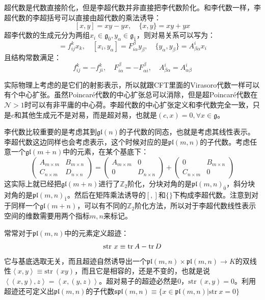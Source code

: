 超代数是代数直接阶化，但是李超代数并非直接把李代数阶化。和李代数一样，李超代数的李超括号可以直接由超代数的乘法诱导：
$$[x,y]=xy-yx,\quad\{x,y\}=xy+yx$$
超李代数的生成元分为两组$x_i\in\mathfrak{g}_{\bar 0},y_\alpha\in\mathfrak{g}_{\bar 1}$，则对易关系可以写为：
\begin{equation}
	[x_i,x_j]=f^k_{ij}x_k,\quad [x_i,y_\alpha]=F^\beta_{i\alpha}y_\beta,\quad \{y_\alpha,y_\beta\}=A^i_{\beta\alpha}x_i
\end{equation}
且结构常数满足：
\begin{equation}
	f^k_{ij}=-f^k_{ji},\quad F^\beta_{i\alpha}=-F^\beta_{\alpha i},\quad A^i_{\beta\alpha}=A^i_{\alpha\beta}
\end{equation}

实际物理上考虑的是它们的射影表示，所以就跟CFT里面的Virasoro代数一样可以有个中心扩张。虽然Poincar\'e代数的中心扩张总可以消除，但是超Poincar\'e代数在$\mathcal{N}>1$时可以有非平庸的中心荷。李超代数的中心扩张定义和李代数完全一致，只是$c$和其他生成元不是对易，而是超对易，也就是$(c,x)=0,\forall x\in\mathfrak{g}$。

\begin{example}[一般线性李超代数]
	李代数比较重要的是考虑其到$\mathfrak{gl}(n)$的子代数的同态，也就是考虑其线性表示。李超代数这边同样也会考虑表示，这个时候对应的是$\mathfrak{pl}(m,n)$的子代数。考虑任意一个$\mathfrak{gl}(m+n)$中的元素，在某个基底下：
	\begin{equation}
		\begin{pmatrix}A_{m\times m}&B_{m\times n}\\C_{n\times m}&D_{n\times n}\end{pmatrix}=\begin{pmatrix}A_{m\times m}&0\\0&D_{n\times n}\end{pmatrix}+\begin{pmatrix}0&B_{m\times n}\\C_{n\times m}&0\end{pmatrix}
	\end{equation}
	这实际上就已经把$\mathfrak{gl}(m+n)$进行了$\mathbb{Z}_2$阶化，分块对角的是$\mathfrak{pl}(m,n)_{\bar 0}$，斜分块对角的是$\mathfrak{pl}(m,n)_{\bar 1}$。然后在矩阵乘法诱导的$[,]$和$\{\}$下构成李超代数。注意到对于同样一个$\mathfrak{gl}(m+n)$，可以有不同的$\mathbb{Z}_2$阶化方法，所以对于李超代数线性表示空间的维数需要用两个指标$m,n$来标记。
	
	常常对于$\mathfrak{pl}(m,n)$中的元素定义超迹：
	\begin{equation}
		\mathrm{str}\  x\equiv\tr A-\tr D
	\end{equation}
	它与基底选取无关，而且超迹自然诱导出一个$\mathfrak{pl}(m,n)\times\mathfrak{pl}(m,n)\to K$的双线性$\left<x,y\right>\equiv\mathrm{str}\ (xy)$，而且它是相容的，还是不变的，也就是说$\left<(x,y),z\right>=\left<x,(y,z)\right>$。超对易子的超迹必然是0，$\mathrm{str}\ (x,y)=0$。利用超迹还可定义出$\mathfrak{pl}(m,n)$的子代数$\mathfrak{spl}(m,n)\equiv\{x\in\mathfrak{pl}(m,n)|\mathrm{str}\ x=0\}$
\end{example}


